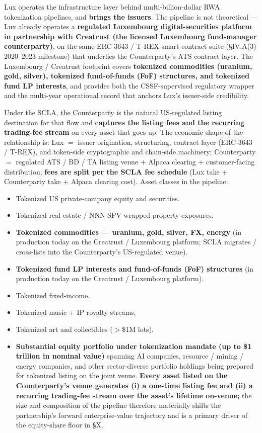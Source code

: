 \documentclass[11pt,letterpaper]{article}
\begin{document}
Lux operates the infrastructure layer behind multi-billion-dollar
RWA tokenization pipelines, and \textbf{brings the issuers}. The
pipeline is not theoretical --- Lux already operates a
\textbf{regulated Luxembourg digital-securities platform in
partnership with Creatrust (the licensed Luxembourg fund-manager
counterparty)}, on the same ERC-3643 / T-REX smart-contract suite
(\S IV.A(3) 2020--2023 milestone) that underlies the Counterparty's
ATS contract layer. The Luxembourg / Creatrust footprint covers
\textbf{tokenized commodities (uranium, gold, silver), tokenized
fund-of-funds (FoF) structures, and tokenized fund LP interests},
and provides both the CSSF-supervised regulatory wrapper and the
multi-year operational record that anchors Lux's issuer-side
credibility.

Under the SCLA, the Counterparty is the natural US-regulated
listing destination for that flow and \textbf{captures the
listing fees and the recurring trading-fee stream} on every asset
that goes up. The economic shape of the relationship is: Lux $=$
issuer origination, structuring, contract layer (ERC-3643 /
T-REX), and token-side cryptographic and chain-side machinery;
Counterparty $=$ regulated ATS / BD / TA listing venue + Alpaca
clearing + customer-facing distribution; \textbf{fees are split
per the SCLA fee schedule} (Lux take + Counterparty take + Alpaca
clearing cost). Asset classes in the pipeline:

\begin{itemize}[leftmargin=1.5em,itemsep=0.1em]
\item Tokenized US private-company equity and securities.
\item Tokenized real estate / NNN-SPV-wrapped property exposures.
\item \textbf{Tokenized commodities --- uranium, gold, silver, FX,
energy} (in production today on the Creatrust / Luxembourg
platform; SCLA migrates / cross-lists into the Counterparty's
US-regulated venue).
\item \textbf{Tokenized fund LP interests and fund-of-funds (FoF)
structures} (in production today on the Creatrust / Luxembourg
platform).
\item Tokenized fixed-income.
\item Tokenized music + IP royalty streams.
\item Tokenized art and collectibles ($>$\$1M lots).
\item \textbf{Substantial equity portfolio under tokenization
mandate (up to \$1 trillion in nominal value)} spanning AI
companies, resource / mining / energy companies, and other
sector-diverse portfolio holdings being prepared for tokenized
listing on the joint venue. \textbf{Every asset listed on the
Counterparty's venue generates (i) a one-time listing fee and (ii) a
recurring trading-fee stream over the asset's lifetime on-venue;}
the size and composition of the pipeline therefore materially shifts
the partnership's forward enterprise-value trajectory and is a
primary driver of the equity-share floor in \S X.
\end{itemize}
\end{document}
